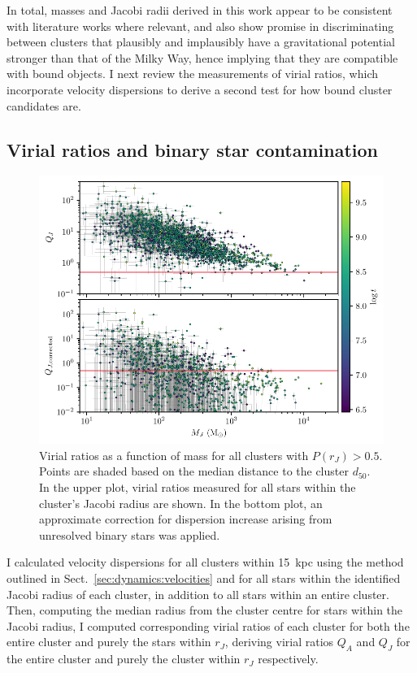 In total, masses and Jacobi radii derived in this work appear to be consistent with literature works where relevant, and also show promise in discriminating between clusters that plausibly and implausibly have a gravitational potential stronger than that of the Milky Way, hence implying that they are compatible with bound objects. I next review the measurements of virial ratios, which incorporate velocity dispersions to derive a second test for how bound cluster candidates are. 


\subsection{Virial ratios and binary star contamination}
\label{sec:dynamics:results:virial}

\begin{figure}[t]
    \centering
    \includegraphics[width=\textwidth]{fig/c4/results_virial_vs_mass.pdf}
    \caption[Virial ratios as a function of mass for all clusters with $P(r_J) > 0.5$]{Virial ratios as a function of mass for all clusters with $P(r_J) > 0.5$. Points are shaded based on the median distance to the cluster $d_{50}$. In the upper plot, virial ratios measured for all stars within the cluster's Jacobi radius are shown. In the bottom plot, an approximate correction for dispersion increase arising from unresolved binary stars was applied.}
    \label{fig:dynamics:results:virial_vs_mass}
\end{figure}

I calculated velocity dispersions for all clusters within 15~kpc using the method outlined in Sect.~\ref{sec:dynamics:velocities} and for all stars within the identified Jacobi radius of each cluster, in addition to all stars within an entire cluster. Then, computing the median radius from the cluster centre for stars within the Jacobi radius, I computed corresponding virial ratios of each cluster for both the entire cluster and purely the stars within $r_J$, deriving virial ratios $Q_A$ and $Q_J$ for the entire cluster and purely the cluster within $r_J$ respectively.

